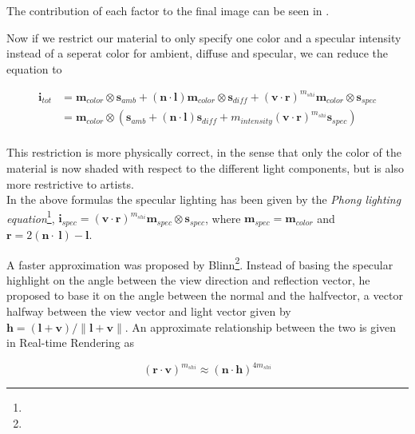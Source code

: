The contribution of each factor to the final image can be seen in
.

Now if we restrict our material to only specify one color and a
specular intensity instead of a seperat color for ambient, diffuse and
specular, we can reduce the equation to

\begin{displaymath}
  \begin{array}{rl}
    \mathbf{i}_{tot} &= \mathbf{m}_{color} \otimes \mathbf{s}_{amb} + (\mathbf{n} \cdot
    \mathbf{l}) \mathbf{m}_{color} \otimes \mathbf{s}_{diff} +
    (\mathbf{v} \cdot \mathbf{r})^{m_{shi}} \mathbf{m}_{color} \otimes
    \mathbf{s}_{spec} \\
    &= \mathbf{m}_{color} \otimes (\mathbf{s}_{amb} + (\mathbf{n} \cdot
    \mathbf{l}) \mathbf{s}_{diff} + m_{intensity} (\mathbf{v} \cdot
    \mathbf{r})^{m_{shi}} \mathbf{s}_{spec}) \\
  \end{array}
\end{displaymath}

This restriction is more physically correct, in the sense that only
the color of the material is now shaded with respect to the different
light components, but is also more restrictive to artists.\\


In the above formulas the specular lighting has been given by the
\emph{Phong lighting equation}\footnote{},
$\mathbf{i}_{spec} = (\mathbf{v} \cdot \mathbf{r})^{m_{shi}}
\mathbf{m}_{spec} \otimes \mathbf{s}_{spec}$, where $\mathbf{m}_{spec}
= \mathbf{m}_{color}$ and $\mathbf{r} = 2 (\mathbf{n} \cdot
\ \mathbf{l}) - \mathbf{l}$.

A faster approximation was proposed by
Blinn\footnote{}. Instead of basing the
specular highlight on the angle between the view direction and
reflection vector, he proposed to base it on the angle between the
normal and the halfvector, a vector halfway between the view vector
and light vector given by $\mathbf{h} = (\mathbf{l} + \mathbf{v}) /
\|\mathbf{l} + \mathbf{v}\|$. An approximate relationship between the
two is given in Real-time Rendering as

\begin{displaymath}
  (\mathbf{r} \cdot \mathbf{v})^{m_{shi}} \approx (\mathbf{n} \cdot \mathbf{h})^{4m_{shi}} 
\end{displaymath}

